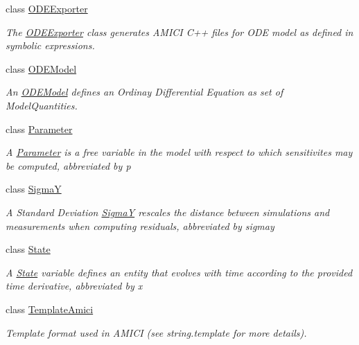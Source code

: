 \begin{DoxyCompactItemize}
class \mbox{\hyperlink{classamici_1_1ode__export_1_1_o_d_e_exporter}{O\+D\+E\+Exporter}}
\begin{DoxyCompactList}\small\item\em The \mbox{\hyperlink{classamici_1_1ode__export_1_1_o_d_e_exporter}{O\+D\+E\+Exporter}} class generates A\+M\+I\+CI C++ files for O\+DE model as defined in symbolic expressions. \end{DoxyCompactList}\item 
class \mbox{\hyperlink{classamici_1_1ode__export_1_1_o_d_e_model}{O\+D\+E\+Model}}
\begin{DoxyCompactList}\small\item\em An \mbox{\hyperlink{classamici_1_1ode__export_1_1_o_d_e_model}{O\+D\+E\+Model}} defines an Ordinay Differential Equation as set of Model\+Quantities. \end{DoxyCompactList}\item 
class \mbox{\hyperlink{classamici_1_1ode__export_1_1_parameter}{Parameter}}
\begin{DoxyCompactList}\small\item\em A \mbox{\hyperlink{classamici_1_1ode__export_1_1_parameter}{Parameter}} is a free variable in the model with respect to which sensitivites may be computed, abbreviated by {\ttfamily p} \end{DoxyCompactList}\item 
class \mbox{\hyperlink{classamici_1_1ode__export_1_1_sigma_y}{SigmaY}}
\begin{DoxyCompactList}\small\item\em A Standard Deviation \mbox{\hyperlink{classamici_1_1ode__export_1_1_sigma_y}{SigmaY}} rescales the distance between simulations and measurements when computing residuals, abbreviated by {\ttfamily sigmay} \end{DoxyCompactList}\item 
class \mbox{\hyperlink{classamici_1_1ode__export_1_1_state}{State}}
\begin{DoxyCompactList}\small\item\em A \mbox{\hyperlink{classamici_1_1ode__export_1_1_state}{State}} variable defines an entity that evolves with time according to the provided time derivative, abbreviated by {\ttfamily x} \end{DoxyCompactList}\item 
class \mbox{\hyperlink{classamici_1_1ode__export_1_1_template_amici}{Template\+Amici}}
\begin{DoxyCompactList}\small\item\em Template format used in A\+M\+I\+CI (see string.\+template for more details). \end{DoxyCompactList}\end{DoxyCompactItemize}
